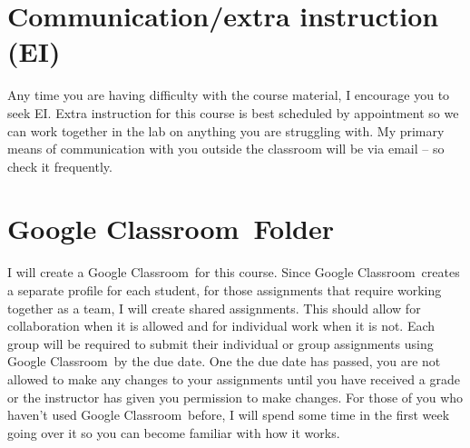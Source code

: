 \documentclass[11pt,courier]{navymemo}
\newcommand{\GoogleClassroom}{Google Classroom}
\begin{document}
\section{Communication/extra instruction (EI)} Any time you are having difficulty with the course material, I encourage you to seek EI. Extra instruction for this course is best scheduled by appointment so we can work together in the lab on anything you are struggling with. My primary means of communication with you outside the classroom will be via email -- so check it frequently.

\section{\GoogleClassroom\ Folder}
I will create a \GoogleClassroom\ for this course.  Since \GoogleClassroom\ creates a separate profile for each student, for those assignments that require working together as a team, I will create shared assignments.  This should allow for collaboration when it is allowed and for individual work when it is not.   Each group will be required to submit their individual or group assignments using \GoogleClassroom\ by the due date.  One the due date has passed, you are not allowed to make any changes to your assignments until you have received a grade or the instructor has given you permission to make changes.  For those of you who haven’t used \GoogleClassroom\ before, I will spend some time in the first week going over it so you can become familiar with how it works.

\clearpage
\end{document}
